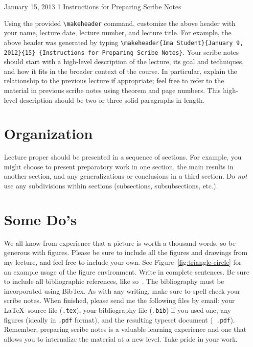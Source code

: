            {January 15, 2013}                        %
           {1}                                       %
           {Instructions for Preparing Scribe Notes} %

\noindent
Using the provided \verb|\makeheader| command, 
customize the above header with your name,
lecture date, lecture number, and lecture title. For
example, the above header was generated by typing 
\verb|\makeheader{Ima Student}{January 9, 2012}{15}|{\tt 
\{Instructions for Preparing Scribe Notes\}}.  Your
scribe notes should start with a high-level description
of the lecture, its goal and techniques, and how it
fits in the broader context of the course. In
particular, explain the relationship to the previous
lecture if appropriate; feel free to refer to the
material in previous scribe notes using theorem and
page numbers.  This high-level description should be
two or three solid paragraphs in length.

\section{Organization}
Lecture proper should be presented in a sequence of
sections. For example, you might choose to present
preparatory work in one section, the main results in
another section, and any generalizations or
conclusions in a third section. Do \emph{not} use
any subdivisions within sections (subsections,
subsubsections, etc.).

\section{Some Do's}
We all know from experience that a picture is worth a
thousand words, so be generous with figures. Please be
sure to include all the figures and drawings 
from my lecture, and feel free to include
your own. See Figure~\ref{fig:triangle-circle} for an
example usage of the figure environment. Write in
complete sentences. Be sure to include all
bibliographic references, like so~\cite{textbook}.  The
bibliography must be incorporated using BibTex.  
As with any writing, make sure to spell check your
scribe notes. When finished, please send me the
following files by email: your \LaTeX\ source file
({\tt .tex}), your bibliography file ({\tt .bib}) if
you used one, any figures (ideally in {\tt .pdf}
format), and the resulting typeset document ({\tt
.pdf}).  Remember, preparing scribe notes is a valuable
learning experience and one that allows you to
internalize the material at a new level. Take pride in
your work. 

